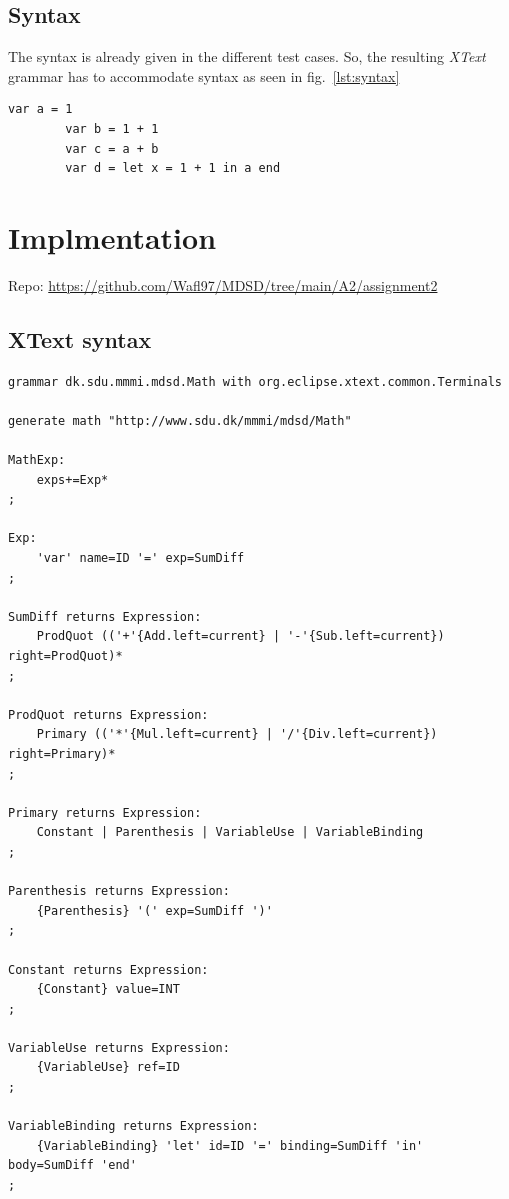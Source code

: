 \documentclass{article}
\begin{document}
\subsection{Syntax}

The syntax is already given in the different test cases. So, the resulting \textit{XText} grammar has to accommodate syntax as seen in fig.~\ref{lst:syntax}

\begin{center}
    \begin{lstlisting}[language={math}, captionpos={b}, caption={Examples of *.math syntax}, label={lst:syntax}]
        var a = 1
        var b = 1 + 1
        var c = a + b
        var d = let x = 1 + 1 in a end
    \end{lstlisting}
\end{center}

\section{Implmentation}

Repo: \url{https://github.com/Wafl97/MDSD/tree/main/A2/assignment2}

\subsection{XText syntax}
\begin{lstlisting}[caption={XText syntax}, captionpos={b}]
grammar dk.sdu.mmmi.mdsd.Math with org.eclipse.xtext.common.Terminals

generate math "http://www.sdu.dk/mmmi/mdsd/Math"

MathExp:
    exps+=Exp*
;

Exp:
    'var' name=ID '=' exp=SumDiff
;

SumDiff returns Expression:
    ProdQuot (('+'{Add.left=current} | '-'{Sub.left=current}) right=ProdQuot)*
;

ProdQuot returns Expression:
    Primary (('*'{Mul.left=current} | '/'{Div.left=current}) right=Primary)*
;

Primary returns Expression:
    Constant | Parenthesis | VariableUse | VariableBinding
;

Parenthesis returns Expression:
    {Parenthesis} '(' exp=SumDiff ')'
;

Constant returns Expression:
    {Constant} value=INT
;

VariableUse returns Expression:
    {VariableUse} ref=ID
;

VariableBinding returns Expression:
    {VariableBinding} 'let' id=ID '=' binding=SumDiff 'in' body=SumDiff 'end'
;
\end{lstlisting}
\end{document}
